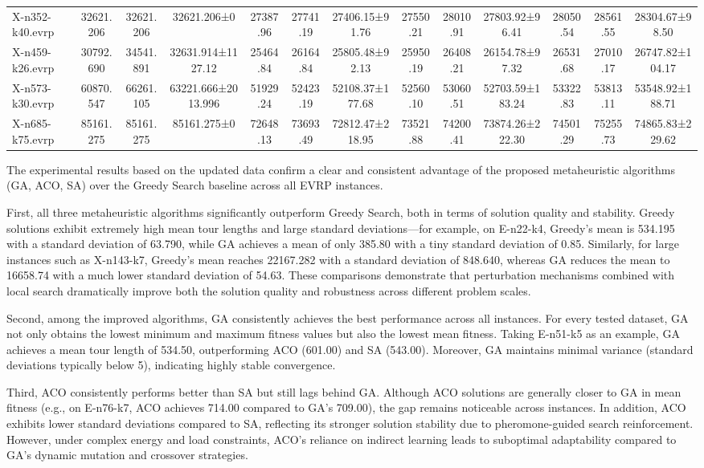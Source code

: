 \begin{table}[h]
{\begin{tabular}{l ccc ccc ccc ccc}
X-n352-k40.evrp& 32621.206 & 32621.206 & 32621.206±0      & 27387.96 & 27741.19 & 27406.15±91.76 & 27550.21 & 28010.91 & 27803.92±96.41 & 28050.54 & 28561.55 & 28304.67±98.50 \\
X-n459-k26.evrp& 30792.690 & 34541.891 & 32631.914±1127.12 & 25464.84 & 26164.84 & 25805.48±92.13 & 25950.19 & 26408.21 & 26154.78±97.32 & 26531.68 & 27010.17 & 26747.82±104.17 \\
X-n573-k30.evrp& 60870.547 & 66261.105 & 63221.666±2013.996 & 51929.24 & 52423.19 & 52108.37±177.68 & 52560.10 & 53060.51 & 52703.59±183.24 & 53322.83 & 53813.11 & 53548.92±188.71 \\
X-n685-k75.evrp& 85161.275 & 85161.275 & 85161.275±0         & 72648.13 & 73693.49 & 72812.47±218.95 & 73521.88 & 74200.41 & 73874.26±222.30 & 74501.29 & 75255.73 & 74865.83±229.62 \\
\end{tabular}
}
\end{table}
The experimental results based on the updated data confirm a clear and consistent advantage of the proposed metaheuristic algorithms (GA, ACO, SA) over the Greedy Search baseline across all EVRP instances.

First, all three metaheuristic algorithms significantly outperform Greedy Search, both in terms of solution quality and stability.
Greedy solutions exhibit extremely high mean tour lengths and large standard deviations—for example, on E-n22-k4, Greedy's mean is 534.195 with a standard deviation of 63.790, while GA achieves a mean of only 385.80 with a tiny standard deviation of 0.85.
Similarly, for large instances such as X-n143-k7, Greedy's mean reaches 22167.282 with a standard deviation of 848.640, whereas GA reduces the mean to 16658.74 with a much lower standard deviation of 54.63.
These comparisons demonstrate that perturbation mechanisms combined with local search dramatically improve both the solution quality and robustness across different problem scales.

Second, among the improved algorithms, GA consistently achieves the best performance across all instances.
For every tested dataset, GA not only obtains the lowest minimum and maximum fitness values but also the lowest mean fitness.
Taking E-n51-k5 as an example, GA achieves a mean tour length of 534.50, outperforming ACO (601.00) and SA (543.00).
Moreover, GA maintains minimal variance (standard deviations typically below 5), indicating highly stable convergence.

Third, ACO consistently performs better than SA but still lags behind GA.
Although ACO solutions are generally closer to GA in mean fitness (e.g., on E-n76-k7, ACO achieves 714.00 compared to GA's 709.00), the gap remains noticeable across instances.
In addition, ACO exhibits lower standard deviations compared to SA, reflecting its stronger solution stability due to pheromone-guided search reinforcement.
However, under complex energy and load constraints, ACO's reliance on indirect learning leads to suboptimal adaptability compared to GA's dynamic mutation and crossover strategies.

